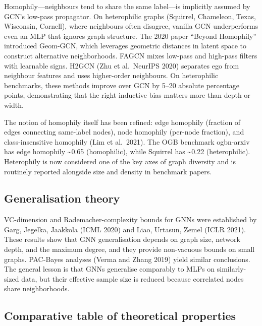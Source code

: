 \documentclass{article}
\begin{document}
Homophily---neighbours tend to share the same label---is implicitly assumed by GCN's low-pass propagator. On heterophilic graphs (Squirrel, Chameleon, Texas, Wisconsin, Cornell), where neighbours often disagree, vanilla GCN underperforms even an MLP that ignores graph structure. The 2020 paper ``Beyond Homophily'' \citep{pei2021geomgcngeometricgr} introduced Geom-GCN, which leverages geometric distances in latent space to construct alternative neighborhoods. FAGCN \citep{bo2021beyondlowfrequency} mixes low-pass and high-pass filters with learnable signs. H2GCN (Zhu et al.~NeurIPS 2020) separates ego from neighbour features and uses higher-order neighbours. On heterophilic benchmarks, these methods improve over GCN by 5--20 absolute percentage points, demonstrating that the right inductive bias matters more than depth or width.

The notion of homophily itself has been refined: edge homophily (fraction of edges connecting same-label nodes), node homophily (per-node fraction), and class-insensitive homophily (Lim et al.~2021). The OGB benchmark ogbn-arxiv has edge homophily \textasciitilde0.65 (homophilic), while Squirrel has \textasciitilde0.22 (heterophilic). Heterophily is now considered one of the key axes of graph diversity and is routinely reported alongside size and density in benchmark papers.

\subsection{Generalisation theory}\label{generalisation-theory}

VC-dimension and Rademacher-complexity bounds for GNNs were established by Garg, Jegelka, Jaakkola (ICML 2020) and Liao, Urtasun, Zemel (ICLR 2021). These results show that GNN generalisation depends on graph size, network depth, and the maximum degree, and they provide non-vacuous bounds on small graphs. PAC-Bayes analyses (Verma and Zhang 2019) yield similar conclusions. The general lesson is that GNNs generalise comparably to MLPs on similarly-sized data, but their effective sample size is reduced because correlated nodes share neighborhoods.

\subsection{Comparative table of theoretical properties}\label{comparative-table-of-theoretical-properties}
\end{document}
